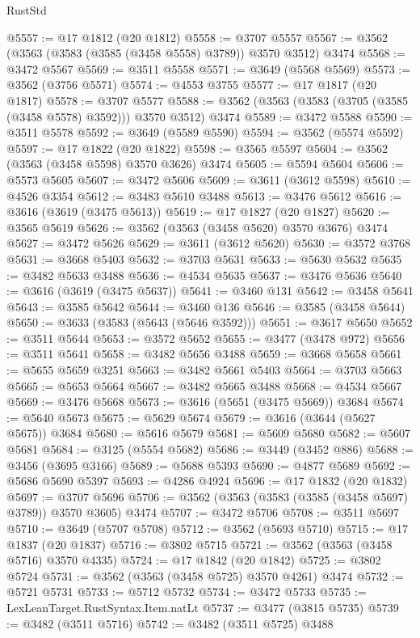\begin{lexlean}{RustStd}
\begin{coremodule}
@5557 := @17 @1812 (@20 @1812)
@5558 := @3707 @5557
@5567 := @3562 (@3563 (@3583 (@3585 (@3458 @5558) @3789)) @3570 @3512) @3474
@5568 := @3472 @5567
@5569 := @3511 @5558
@5571 := @3649 (@5568 @5569)
@5573 := @3562 (@3756 @5571)
@5574 := @4553 @3755
@5577 := @17 @1817 (@20 @1817)
@5578 := @3707 @5577
@5588 := @3562 (@3563 (@3583 (@3705 (@3585 (@3458 @5578) @3592))) @3570 @3512) @3474
@5589 := @3472 @5588
@5590 := @3511 @5578
@5592 := @3649 (@5589 @5590)
@5594 := @3562 (@5574 @5592)
@5597 := @17 @1822 (@20 @1822)
@5598 := @3565 @5597
@5604 := @3562 (@3563 (@3458 @5598) @3570 @3626) @3474
@5605 := @5594 @5604
@5606 := @5573 @5605
@5607 := @3472 @5606
@5609 := @3611 (@3612 @5598)
@5610 := @4526 @3354
@5612 := @3483 @5610 @3488
@5613 := @3476 @5612
@5616 := @3616 (@3619 (@3475 @5613))
@5619 := @17 @1827 (@20 @1827)
@5620 := @3565 @5619
@5626 := @3562 (@3563 (@3458 @5620) @3570 @3676) @3474
@5627 := @3472 @5626
@5629 := @3611 (@3612 @5620)
@5630 := @3572 @3768
@5631 := @3668 @5403
@5632 := @3703 @5631
@5633 := @5630 @5632
@5635 := @3482 @5633 @3488
@5636 := @4534 @5635
@5637 := @3476 @5636
@5640 := @3616 (@3619 (@3475 @5637))
@5641 := @3460 @131
@5642 := @3458 @5641
@5643 := @3585 @5642
@5644 := @3460 @136
@5646 := @3585 (@3458 @5644)
@5650 := @3633 (@3583 (@5643 (@5646 @3592)))
@5651 := @3617 @5650
@5652 := @3511 @5644
@5653 := @3572 @5652
@5655 := @3477 (@3478 @972)
@5656 := @3511 @5641
@5658 := @3482 @5656 @3488
@5659 := @3668 @5658
@5661 := @5655 @5659 @3251
@5663 := @3482 @5661 @5403
@5664 := @3703 @5663
@5665 := @5653 @5664
@5667 := @3482 @5665 @3488
@5668 := @4534 @5667
@5669 := @3476 @5668
@5673 := @3616 (@5651 (@3475 @5669)) @3684
@5674 := @5640 @5673
@5675 := @5629 @5674
@5679 := @3616 (@3644 (@5627 @5675)) @3684
@5680 := @5616 @5679
@5681 := @5609 @5680
@5682 := @5607 @5681
@5684 := @3125 (@5554 @5682)
@5686 := @3449 (@3452 @886)
@5688 := @3456 (@3695 @3166)
@5689 := @5688 @5393
@5690 := @4877 @5689
@5692 := @5686 @5690 @5397
@5693 := @4286 @4924
@5696 := @17 @1832 (@20 @1832)
@5697 := @3707 @5696
@5706 := @3562 (@3563 (@3583 (@3585 (@3458 @5697) @3789)) @3570 @3605) @3474
@5707 := @3472 @5706
@5708 := @3511 @5697
@5710 := @3649 (@5707 @5708)
@5712 := @3562 (@5693 @5710)
@5715 := @17 @1837 (@20 @1837)
@5716 := @3802 @5715
@5721 := @3562 (@3563 (@3458 @5716) @3570 @4335)
@5724 := @17 @1842 (@20 @1842)
@5725 := @3802 @5724
@5731 := @3562 (@3563 (@3458 @5725) @3570 @4261) @3474
@5732 := @5721 @5731
@5733 := @5712 @5732
@5734 := @3472 @5733
@5735 := LexLeanTarget.RustSyntax.Item.natLt
@5737 := @3477 (@3815 @5735)
@5739 := @3482 (@3511 @5716)
@5742 := @3482 (@3511 @5725) @3488

\end{coremodule}
\end{lexlean}
